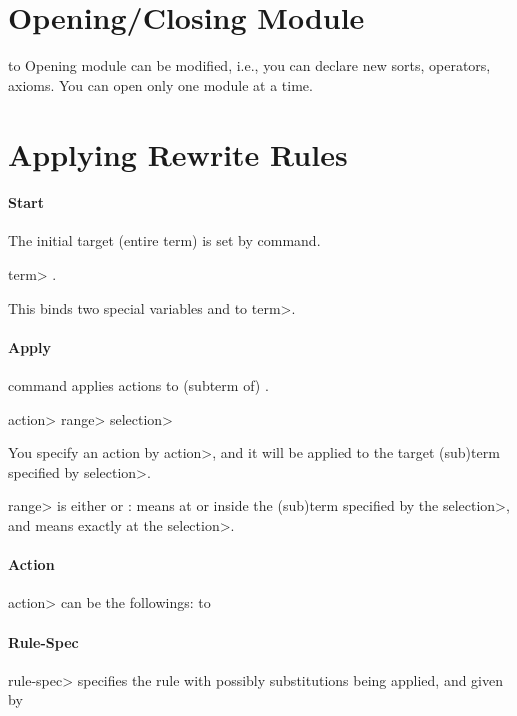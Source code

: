 \section{Opening/Closing Module}

\paralign to 
Opening module can be modified, i.e., you can declare new sorts,
operators, axioms. You can open only one module at a time.

\section{Applying Rewrite Rules}

\paragraph{Start}
The initial target (entire term) is set by  command.

 \<term> .

This binds two special variables  and
 to \<term>. 

\paragraph{Apply}
 command applies actions to (subterm of) .

 \<action> \<range> \<selection>

You specify an action by \<action>, and it will be applied to the
target (sub)term specified by \<selection>. 

\<range> is either  or :  means at or
inside the  (sub)term specified by the \<selection>, and 
means exactly at the \<selection>.

\paragraph{Action}
\<action> can be the followings:
\paralign to 

\paragraph{Rule-Spec}
\<rule-spec> specifies the rule with possibly substitutions being
applied, and given by 

